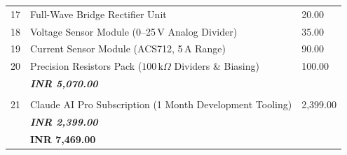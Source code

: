\begin{table}[H]
\begin{tabularx}{\textwidth}{@{} M{0.55in} Y R{1.1in} @{}}
17 & Full-Wave Bridge Rectifier Unit & 20.00 \\
18 & Voltage Sensor Module (0--25\,V Analog Divider) & 35.00 \\
19 & Current Sensor Module (ACS712, 5\,A Range) & 90.00 \\
20 & Precision Resistors Pack ($100\,\text{k}\Omega$ Dividers \& Biasing) & 100.00 \\
\midrule
{}
 & \textit{\textbf{INR 5,070.00}} \\
\midrule
{}
 \\
\midrule
{}
21 & Claude AI Pro Subscription (1 Month Development Tooling) & 2,399.00 \\
\midrule
{}
 & \textit{\textbf{INR 2,399.00}} \\
\midrule
{}
 & \textbf{\color{deepnavy}INR 7,469.00} \\
\bottomrule
\end{tabularx}
\end{table}
